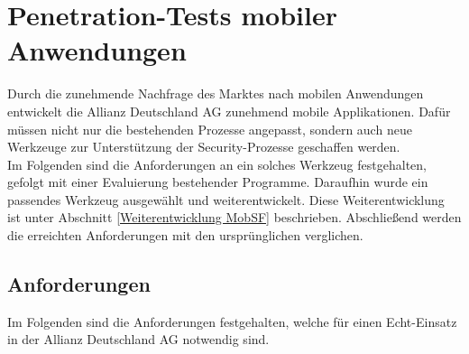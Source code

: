 \chapter{Penetration-Tests mobiler Anwendungen}
Durch die zunehmende Nachfrage des Marktes nach mobilen Anwendungen entwickelt die Allianz Deutschland AG zunehmend mobile Applikationen. Dafür müssen nicht nur die bestehenden Prozesse angepasst, sondern auch neue Werkzeuge zur Unterstützung der Security-Prozesse geschaffen werden.\\

Im Folgenden sind die Anforderungen an ein solches Werkzeug festgehalten, gefolgt mit einer Evaluierung bestehender Programme. Daraufhin wurde ein passendes Werkzeug ausgewählt und weiterentwickelt. Diese Weiterentwicklung ist unter Abschnitt \ref{Weiterentwicklung MobSF} beschrieben. Abschließend werden die erreichten Anforderungen mit den ursprünglichen verglichen.

\section{Anforderungen}\label{ref:PenMobAnwdWeiterAnford}
Im Folgenden sind die Anforderungen festgehalten, welche für einen Echt-Einsatz in der Allianz Deutschland AG notwendig sind.


